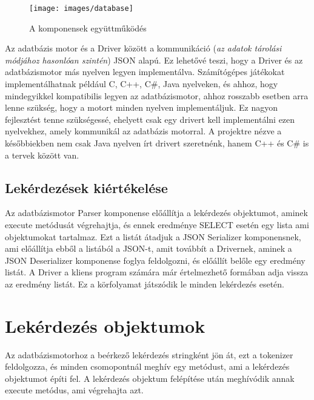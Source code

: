 \begin{figure}[htb]
	\begin{center}
		\texttt{[image: images/database]}
		\caption{A komponensek együttműködés}
		\label{fig:database}
	\end{center}
\end{figure}

Az adatbázis motor és a Driver között a kommunikáció (\textit{az adatok tárolási módjához hasonlóan szintén}) JSON alapú. Ez lehetővé teszi, hogy a Driver és az adatbázismotor más nyelven legyen implementálva. Számítógépes játékokat implementálhatnak például C, C++, C\#, Java nyelveken, és ahhoz, hogy mindegyikkel kompatibilis legyen az adatbázismotor, ahhoz rosszabb esetben arra lenne szükség, hogy a motort minden nyelven implementáljuk. Ez nagyon fejlesztést tenne szükségessé, ehelyett csak egy drivert kell implementálni ezen nyelvekhez, amely kommunikál az adatbázis motorral. A projektre nézve a későbbiekben nem csak Java nyelven írt drivert szeretnénk, hanem C++ és C\# is a tervek között van.

\subsection{Lekérdezések kiértékelése}

Az adatbázismotor Parser komponense előállítja a lekérdezés objektumot, aminek execute metódusát végrehajtja, és ennek eredménye SELECT esetén egy lista ami objektumokat tartalmaz. Ezt a listát átadjuk a JSON Serializer komponensnek, ami előállítja ebből a listából a JSON-t, amit továbbít a Drivernek, aminek a JSON Deserializer komponense foglya feldolgozni, és előállít belőle egy eredmény listát. A Driver a kliens program számára már értelmezhető formában adja vissza az eredmény listát. Ez a körfolyamat játszódik le minden lekérdezés esetén.

\begin{comment}{Ide majd be kellene hivatkozni egy külön ábrát, vagy jelölni, hogy a komponenses ábrán mi hol zajlik éppen.}
\end{comment}

\section{Lekérdezés objektumok}

Az adatbázismotorhoz a beérkező lekérdezés stringként jön át, ezt a tokenizer feldolgozza, és minden csomopontnál meghív egy metódust, ami a lekérdezés objektumot építi fel. A lekérdezés objektum felépítése után meghívódik annak execute metódus, ami végrehajta azt.

